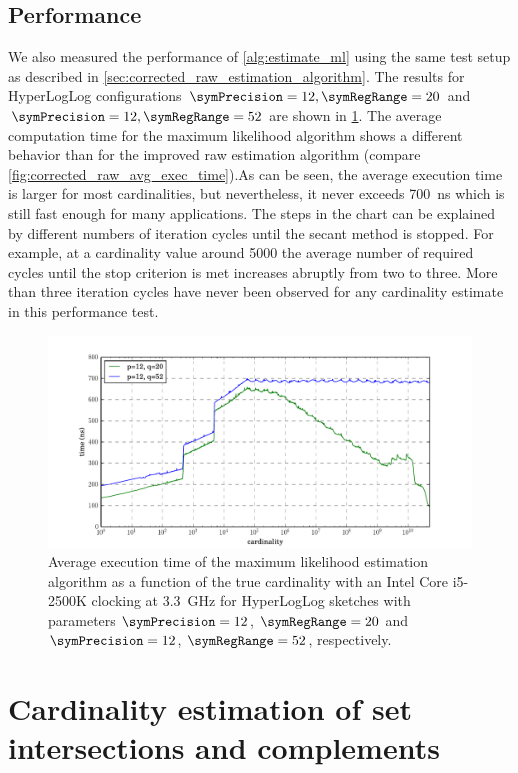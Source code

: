 \documentclass[a4paper]{scrartcl}
\begin{document}
\subsection{Performance}
We also measured the performance of \cref{alg:estimate_ml} using the same test setup as described in \cref{sec:corrected_raw_estimation_algorithm}. The results for HyperLogLog configurations $\symPrecision=12, \symRegRange=20$ and $\symPrecision=12, \symRegRange=52$ are shown in \cref{fig:avg_exec_time}. The average computation time for the maximum likelihood algorithm shows a different behavior than for the improved raw estimation algorithm (compare \cref{fig:corrected_raw_avg_exec_time}).As can be seen, the average execution time is larger for most cardinalities, but nevertheless, it never exceeds \SI{700}{\nano\second} which is still fast enough for many applications. The steps in the chart can be explained by different numbers of iteration cycles until the secant method is stopped. For example, at a cardinality value around \num{5000} the average number of required cycles until the stop criterion is met increases abruptly from two to three. More than three iteration cycles have never been observed for any cardinality estimate in this performance test.

\begin{figure}
\centering
\includegraphics[width=1\textwidth]{max_likelihood_avg_exec_time}
\caption{Average execution time of the maximum likelihood estimation algorithm as a function of the true cardinality with an Intel Core i5-2500K clocking at \SI{3.3}{\giga\hertz} for HyperLogLog sketches with parameters $\symPrecision=12$, $\symRegRange=20$ and $\symPrecision=12$, $\symRegRange=52$, respectively.}
\label{fig:avg_exec_time}
\end{figure}

\section{Cardinality estimation of set intersections and complements}
\label{sec:cardinality_estimation_set_intersections}
\end{document}
